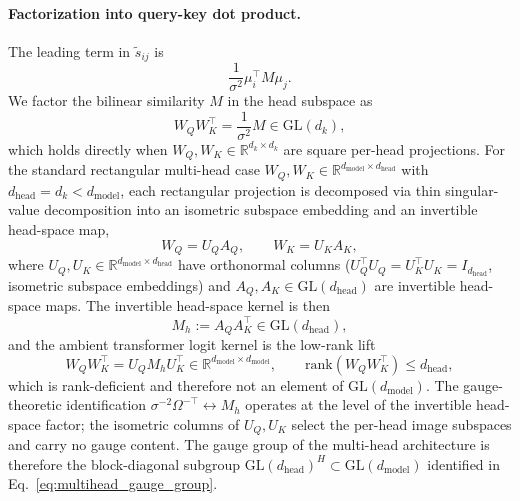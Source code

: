 \documentclass[11pt]{article}
\begin{document}
\paragraph{Factorization into query-key dot product.}
The leading term in $\tilde{s}_{ij}$ is
\begin{equation}
\frac{1}{\sigma^2}\mu_i^\top M \mu_j.
\end{equation}
We factor the bilinear similarity $M$ in the head subspace as
\begin{equation}
W_Q W_K^\top = \frac{1}{\sigma^2} M \in \mathrm{GL}(d_k),
\label{eq:wqwk_square}
\end{equation}
which holds directly when $W_Q, W_K \in \mathbb{R}^{d_k \times d_k}$ are square per-head projections. For the standard rectangular multi-head case $W_Q, W_K \in \mathbb{R}^{d_{\text{model}}\times d_{\text{head}}}$ with $d_{\text{head}} = d_k < d_{\text{model}}$, each rectangular projection is decomposed via thin singular-value decomposition into an isometric subspace embedding and an invertible head-space map,
\begin{equation}
W_Q = U_Q A_Q, \qquad W_K = U_K A_K,
\label{eq:thin_svd_decomposition}
\end{equation}
where $U_Q, U_K \in \mathbb{R}^{d_{\text{model}}\times d_{\text{head}}}$ have orthonormal columns ($U_Q^\top U_Q = U_K^\top U_K = I_{d_{\text{head}}}$, isometric subspace embeddings) and $A_Q, A_K \in \mathrm{GL}(d_{\text{head}})$ are invertible head-space maps. The invertible head-space kernel is then
\begin{equation}
M_h := A_Q A_K^\top \in \mathrm{GL}(d_{\text{head}}),
\label{eq:head_space_kernel_participatory}
\end{equation}
and the ambient transformer logit kernel is the low-rank lift
\begin{equation}
W_Q W_K^\top = U_Q M_h U_K^\top \in \mathbb{R}^{d_{\text{model}}\times d_{\text{model}}}, \qquad \mathrm{rank}(W_Q W_K^\top) \le d_{\text{head}},
\label{eq:low_rank_lift}
\end{equation}
which is rank-deficient and therefore not an element of $\mathrm{GL}(d_{\text{model}})$. The gauge-theoretic identification $\sigma^{-2}\Omega^{-\top} \leftrightarrow M_h$ operates at the level of the invertible head-space factor; the isometric columns of $U_Q, U_K$ select the per-head image subspaces and carry no gauge content. The gauge group of the multi-head architecture is therefore the block-diagonal subgroup $\mathrm{GL}(d_{\text{head}})^H \subset \mathrm{GL}(d_{\text{model}})$ identified in Eq.~\eqref{eq:multihead_gauge_group}.
\end{document}
